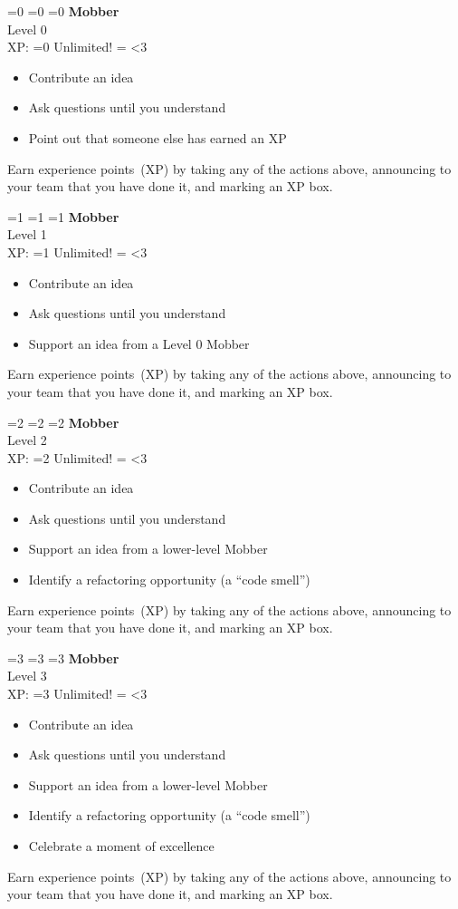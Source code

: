 \documentclass[20pt]{extarticle}
\makeatletter
\newcommand{\myrepeat}[2]{%
  \begingroup
  \my@repeat@count=\z@
  \@whilenum\my@repeat@count<#1\do{#2\advance\my@repeat@count\@ne}%
  \endgroup
}
\makeatother
\begin{document}
\newenvironment{role}[2]
{
  \begin{centering}
    \ifnum0=#2 \newcommand{\xp}{3}
    \else \ifnum1=#2 \newcommand{\xp}{5} 
      \else \ifnum2=#2 \newcommand{\xp}{7} 
        \else \newcommand{\xp}{0}
        \fi
      \fi
    \fi
  \textbf{\large{#1}}\\
  Level #2\\
  XP: \ifnum3=#2 Unlimited! \else \myrepeat{\xp}{$\square$} \fi
\end{centering}
\begin{itemize}
}
{
\end{itemize}
\vfill Earn experience points~(XP) by taking any of the actions above,
announcing to your team that you have done it, and marking an XP box.
\pagebreak }

\begin{role}{Mobber}{0}
  \item Contribute an idea
  \item Ask questions until you understand
  \item Point out that someone else has earned an XP
\end{role}

\begin{role}{Mobber}{1}
  \item Contribute an idea
  \item Ask questions until you understand
  \item Support an idea from a Level 0 Mobber
\end{role}

\begin{role}{Mobber}{2}
  \item Contribute an idea
  \item Ask questions until you understand
  \item Support an idea from a lower-level Mobber
  \item Identify a refactoring opportunity (a ``code smell'')
\end{role}

\begin{role}{Mobber}{3}
  \item Contribute an idea
  \item Ask questions until you understand
  \item Support an idea from a lower-level Mobber
  \item Identify a refactoring opportunity (a ``code smell'')
  \item Celebrate a moment of excellence
\end{role}
\end{document}

